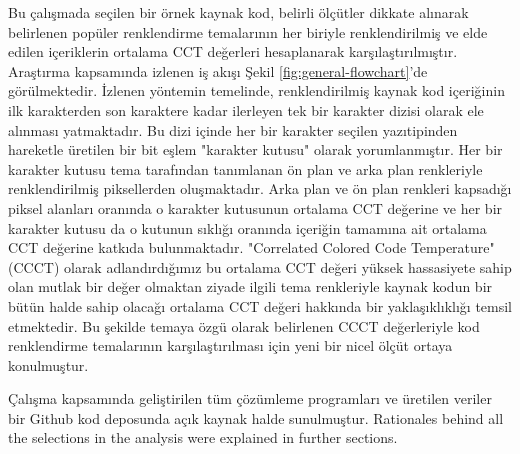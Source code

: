 \documentclass{article}
\begin{document}
Bu çalışmada seçilen bir örnek kaynak kod, belirli ölçütler dikkate alınarak belirlenen popüler renklendirme temalarının her biriyle renklendirilmiş ve elde edilen içeriklerin ortalama CCT değerleri hesaplanarak karşılaştırılmıştır. Araştırma kapsamında izlenen iş akışı Şekil \ref{fig:general-flowchart}'de görülmektedir. İzlenen yöntemin temelinde,
renklendirilmiş kaynak kod içeriğinin ilk karakterden son karaktere kadar ilerleyen tek bir karakter dizisi olarak ele alınması yatmaktadır. Bu dizi içinde her bir karakter seçilen yazıtipinden hareketle üretilen bir bit eşlem "karakter kutusu" olarak yorumlanmıştır. Her bir karakter kutusu tema tarafından tanımlanan ön plan ve arka plan renkleriyle
renklendirilmiş piksellerden oluşmaktadır. Arka plan ve ön plan renkleri kapsadığı piksel alanları oranında o karakter kutusunun ortalama CCT değerine ve her bir karakter kutusu da o kutunun sıklığı oranında içeriğin tamamına ait ortalama CCT değerine katkıda bulunmaktadır. "Correlated Colored Code Temperature" (CCCT) olarak adlandırdığımız bu ortalama CCT
değeri yüksek hassasiyete sahip olan mutlak bir değer olmaktan ziyade ilgili tema renkleriyle kaynak kodun bir bütün halde sahip olacağı ortalama CCT değeri hakkında bir yaklaşıklıklığı temsil etmektedir. Bu şekilde temaya özgü olarak belirlenen CCCT değerleriyle kod renklendirme temalarının karşılaştırılması için yeni bir nicel ölçüt ortaya
konulmuştur.

Çalışma kapsamında geliştirilen tüm çözümleme programları ve üretilen veriler bir Github kod deposunda açık kaynak halde sunulmuştur\cite{Oktas_Code_CCT_2022}. Rationales behind all the selections in the analysis were explained in further sections.

\begin{comment}
In this study, the CCT was utilized to calculate the quantity of blue light contained in popular color themes chosen by developers. It was observed that the average CCT values of both the dark and light versions of the examined themes were above the D65 threshold and contained intense blue light. Theme developers should consider the risks that blue light poses to human eye health while creating their themes.

The amount of blue light in the color theme was determined using the workflow shown in Figure
\ref{fig:general-flowchart}. Primarily, the themes to be used in the study were selected.
\end{comment}
\end{document}

